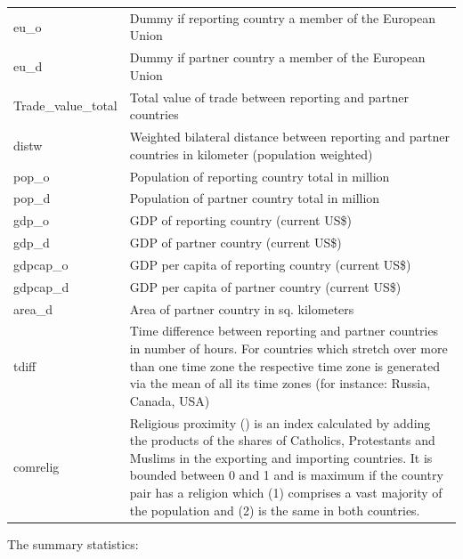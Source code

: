 \documentclass{Trade_template}
\numberwithin{equation}{section}
\begin{document}
\begin{table}[]
{\begin{tabularx}{\textwidth}{@{} M X  @{}}
eu\_o & Dummy if reporting country a member of the European Union \\
eu\_d & Dummy if partner country a member of the European Union \\
Trade\_value\_total & Total value of trade between reporting and partner countries \\
distw & Weighted bilateral distance between reporting and partner countries in kilometer (population weighted) \\
pop\_o & Population of reporting country total in million \\
pop\_d & Population of partner country total in million \\
gdp\_o & GDP of reporting country (current US\$) \\
gdp\_d & GDP of partner country (current US\$) \\
gdpcap\_o & GDP per capita of reporting country (current US\$) \\
gdpcap\_d & GDP per capita of partner country (current US\$) \\
area\_d & Area of partner country in sq. kilometers \\
tdiff & Time difference between reporting and partner countries in number of hours. For countries which stretch over more than  one  time  zone   the  respective  time  zone  is generated via the mean of all its time zones (for instance: Russia, Canada, USA) \\
comrelig & Religious proximity (\citet{disdier2007je}) is an index calculated by adding the products of the shares of Catholics, Protestants and Muslims in the exporting and importing countries. It is bounded between 0 and 1 and is maximum if the country pair has a religion which (1) comprises a vast majority of the population and (2) is the same in both countries. \\ \bottomrule
\end{tabularx}}
\end{table}

The summary statistics:
\end{document}
